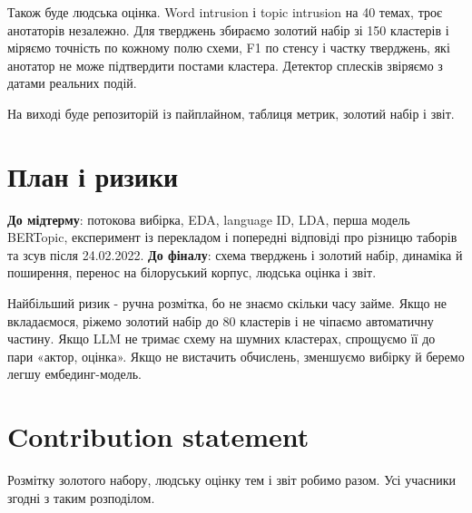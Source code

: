 \documentclass[ukrainian]{ucuproposal}
\begin{document}
Також буде людська оцінка. Word intrusion і topic intrusion на 40
темах, троє анотаторів незалежно.
Для тверджень збираємо золотий набір зі 150 кластерів і міряємо точність
по кожному полю схеми, F1 по стенсу і частку тверджень, які анотатор не
може підтвердити постами кластера. Детектор сплесків звіряємо з датами
реальних подій.

На виході буде репозиторій із пайплайном, таблиця метрик, золотий набір і
звіт.

\section{План і ризики}
\textbf{До мідтерму}: потокова вибірка, EDA, language ID, LDA, перша
модель BERTopic, експеримент із перекладом і попередні відповіді про
різницю таборів та зсув після 24.02.2022. \textbf{До фіналу}: схема
тверджень і золотий набір, динаміка й поширення, перенос на білоруський
корпус, людська оцінка і звіт.

Найбільший ризик - ручна розмітка, бо не знаємо скільки часу займе. Якщо не вкладаємося, ріжемо золотий набір до 80 кластерів і не
чіпаємо автоматичну частину. Якщо LLM не тримає схему на шумних
кластерах, спрощуємо її до пари «актор, оцінка». Якщо не вистачить
обчислень, зменшуємо вибірку й беремо легшу ембединг-модель.

\section{Contribution statement}
\begin{contributions}
\end{contributions}
Розмітку золотого набору, людську оцінку тем і звіт робимо разом. Усі
учасники згодні з таким розподілом.

\ucuprintbibliography
\end{document}
